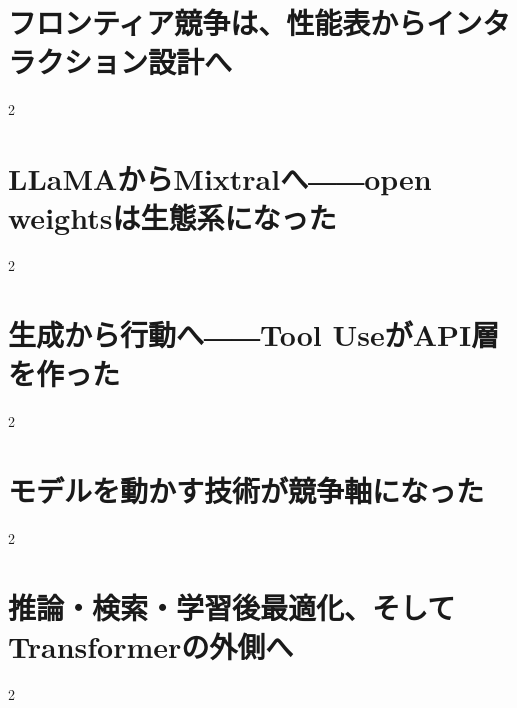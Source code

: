 \documentclass[lualatex,a4paper,11pt]{jlreq}
\begin{document}
\surveycover
\clearpage


\clearpage
\section{フロンティア競争は、性能表からインタラクション設計へ}
\label{pkg:frontier-interface}

\medskip
\begin{multicols}{2}

\end{multicols}


\clearpage
\section{LLaMAからMixtralへ――open weightsは生態系になった}
\label{pkg:open-weight-ecosystem}

\medskip
\begin{multicols}{2}

\end{multicols}


\clearpage
\section{生成から行動へ――Tool UseがAPI層を作った}
\label{pkg:tool-action-layer}

\medskip
\begin{multicols}{2}

\end{multicols}


\clearpage
\section{モデルを動かす技術が競争軸になった}
\label{pkg:runtime-adaptation}

\medskip
\begin{multicols}{2}

\end{multicols}


\clearpage
\section{推論・検索・学習後最適化、そしてTransformerの外側へ}
\label{pkg:reasoning-retrieval-architecture}

\medskip
\begin{multicols}{2}

\end{multicols}

\end{document}
